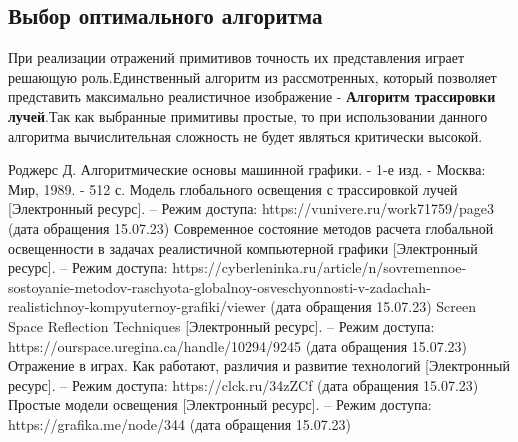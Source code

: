 \documentclass[a4paper,14pt, unknownkeysallowed]{extreport}
\begin{document}
\subsection{Выбор оптимального алгоритма}
При реализации отражений примитивов точность их представления играет решающую роль.Единственный алгоритм из рассмотренных, который позволяет представить максимально
реалистичное изображение - \textbf{Алгоритм трассировки лучей}.Так как выбранные примитивы простые, то при использовании данного алгоритма вычислительная
сложность не будет являться критически высокой.















\begin{thebibliography}{9}
	Роджерс Д. Алгоритмические основы машинной графики. - 1-е изд. - Москва: Мир, 1989. - 512 с.
	Модель глобального освещения с трассировкой лучей [Электронный ресурс]. – Режим доступа: https://vunivere.ru/work71759/page3 (дата обращения 15.07.23)
	Современное состояние методов расчета глобальной освещенности в задачах реалистичной компьютерной графики [Электронный ресурс]. – Режим доступа: https://cyberleninka.ru/article/n/sovremennoe-sostoyanie-metodov-raschyota-globalnoy-osveschyonnosti-v-zadachah-realistichnoy-kompyuternoy-grafiki/viewer (дата обращения 15.07.23)
	Screen Space Reflection Techniques [Электронный ресурс]. – Режим доступа: https://ourspace.uregina.ca/handle/10294/9245 (дата обращения 15.07.23)
	Отражение в играх. Как работают, различия и развитие технологий [Электронный ресурс]. – Режим доступа: https://clck.ru/34zZCf (дата обращения 15.07.23)
	Простые модели освещения  [Электронный ресурс]. – Режим доступа: https://grafika.me/node/344 (дата обращения 15.07.23)
\end{thebibliography}

\end{document}
